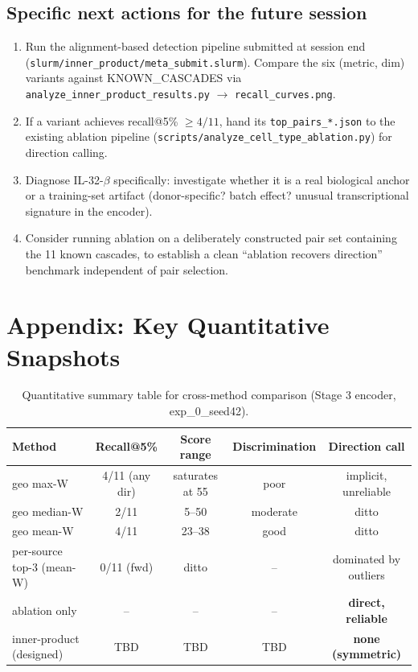 \documentclass[11pt,a4paper]{article}
\newcommand{\codeword}[1]{\texttt{\small #1}}
\newcommand{\KEY}[1]{\textbf{\color{tablehead}#1}}
\begin{document}
\subsection{Specific next actions for the future session}

\begin{enumerate}[label=\textbf{N\arabic*.},leftmargin=*,itemsep=2pt]
\item Run the alignment-based detection pipeline submitted at session
end (\codeword{slurm/inner\_product/meta\_submit.slurm}). Compare the
six (metric, dim) variants against KNOWN\_CASCADES via
\codeword{analyze\_inner\_product\_results.py} $\to$ \codeword{recall\_curves.png}.
\item If a variant achieves recall@5\% $\geq 4/11$, hand its
\codeword{top\_pairs\_*.json} to the existing ablation pipeline
(\codeword{scripts/analyze\_cell\_type\_ablation.py}) for direction
calling.
\item Diagnose IL-32-$\beta$ specifically: investigate whether it is
a real biological anchor or a training-set artifact (donor-specific?
batch effect? unusual transcriptional signature in the encoder).
\item Consider running ablation on a deliberately constructed pair set
containing the 11 known cascades, to establish a clean ``ablation
recovers direction'' benchmark independent of pair selection.
\end{enumerate}

\section*{Appendix: Key Quantitative Snapshots}

\begin{table}[h]
\centering
\caption{Quantitative summary table for cross-method comparison
(Stage 3 encoder, exp\_0\_seed42).}
\label{tab:method-summary}
\small
\begin{tabular}{lcccc}
\toprule
\textbf{Method} & \textbf{Recall@5\%} & \textbf{Score range} &
\textbf{Discrimination} & \textbf{Direction call} \\
\midrule
geo max-W                & 4/11 (any dir) & saturates at 55 & poor    & implicit, unreliable \\
geo median-W             & 2/11           & 5--50          & moderate & ditto \\
geo mean-W               & 4/11           & 23--38         & good    & ditto \\
per-source top-3 (mean-W) & 0/11 (fwd)   & ditto          & --       & dominated by outliers \\
ablation only             & --            & --             & --       & \KEY{direct, reliable} \\
inner-product (designed)  & TBD           & TBD           & TBD     & \KEY{none (symmetric)} \\
\bottomrule
\end{tabular}
\end{table}
\end{document}
